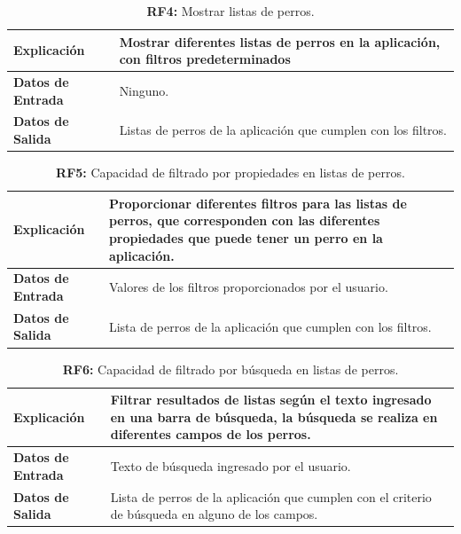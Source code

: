 \documentclass[a4paper, 12pt]{article}
\begin{document}
\begin{table}[H]
\captionsetup{justification=raggedright,singlelinecheck=false}
\caption{\textbf{RF4:} Mostrar listas de perros.}
\label{tab:RF4}
	\begin{tabular}{|m{5cm}|m{10cm}|}
	\hline
	\textbf{Explicación} & Mostrar diferentes listas de perros en la aplicación, con filtros predeterminados \\ 
	\hline
	\textbf{Datos de Entrada} & Ninguno. \\ 
	\hline
	\textbf{Datos de Salida} & Listas de perros de la aplicación que cumplen con los filtros. \\ 
	\hline
\end{tabular}
\end{table}

\begin{table}[H]
\captionsetup{justification=raggedright,singlelinecheck=false}
\caption{\textbf{RF5:} Capacidad de filtrado por propiedades en listas de perros.}
\label{tab:RF5}
	\begin{tabular}{|m{5cm}|m{10cm}|}
	\hline
	\textbf{Explicación} & Proporcionar diferentes filtros para las listas de perros, que corresponden con las diferentes propiedades que puede tener un perro en la aplicación. \\ 
	\hline
	\textbf{Datos de Entrada} & Valores de los filtros proporcionados por el usuario. \\ 
	\hline
	\textbf{Datos de Salida} & Lista de perros de la aplicación que cumplen con los filtros. \\ 
	\hline
\end{tabular}
\end{table}

\begin{table}[H]
\captionsetup{justification=raggedright,singlelinecheck=false}
\caption{\textbf{RF6:} Capacidad de filtrado por búsqueda en listas de perros.}
\label{tab:RF6}
	\begin{tabular}{|m{5cm}|m{10cm}|}
	\hline
	\textbf{Explicación} & Filtrar resultados de listas según el texto ingresado en una barra de búsqueda, la búsqueda se realiza en diferentes campos de los perros. \\ 
	\hline
	\textbf{Datos de Entrada} & Texto de búsqueda ingresado por el usuario. \\ 
	\hline
	\textbf{Datos de Salida} &  Lista de perros de la aplicación que cumplen con el criterio de búsqueda en alguno de los campos. \\ 
	\hline
\end{tabular}
\end{table}
\end{document}
